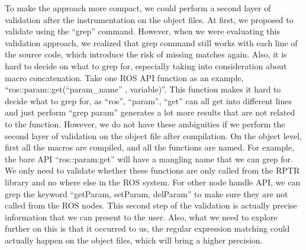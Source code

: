To make the approach more compact, we could perform a second layer of validation after the instrumentation on the object files. At first, we proposed to validate using the “grep” command. However, when we were evaluating this validation approach, we realized that grep command still works with each line of the source code, which introduce the risk of missing matches again. Also, it is hard to decide on what to grep for, especially taking into consideration about macro concatenation. Take one ROS API function as an example, “ros::param::get(“param_name” ,  variable)”. This function makes it hard to decide what to grep for, as “ros”, “param”, “get” can all get into different lines and just perform “grep param” generates a lot more results that are not related to the function. However, we do not have these ambiguities if we perform the second layer of validation on the object file after compilation. On the object level, first all the macros are compiled, and all the functions are named. For example, the bare API “ros::param:get” will have a mangling name that we can grep for. We only need to validate whether these functions are only called from the RPTR library and no where else in the ROS system. For other node handle API, we can grep the keyword “getParam, setParam, delParam” to make sure they are not called from the ROS nodes. This second step of the validation is actually precise information that we can present to the user. Also, what we need to explore further on this is that it occurred to us, the regular expression matching could actually happen on the object files, which will bring a higher precision. 

